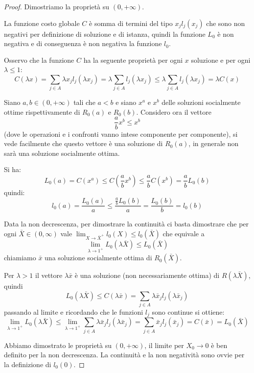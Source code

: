 \documentclass[a4paper]{article}
\theoremstyle{plain}
\theoremstyle{definition}
\theoremstyle{remark}
\newcommand{\pa}[1]{\left(#1\right)}
\begin{document}
\begin{proof}
  Dimostriamo la proprietà su $\pa{0,+\infty}$.

  La funzione costo globale $C$ è somma di termini del tipo $x_j
  l_j(x_j)$ che sono non negativi per definizione di soluzione e di
  istanza, quindi la funzione $L_0$ è non negativa e di conseguenza è
  non negativa la funzione $l_0$.

  Osservo che la funzione $C$ ha la seguente proprietà per ogni $x$
  soluzione e per ogni $\lambda \le 1$:
  \[ C\pa{\lambda x} = \sum _{j\in A} \lambda x_j l_j\pa{\lambda x_j}
    = \lambda \sum _{j\in A} l_j\pa{\lambda x_j} \le \lambda \sum
    _{j\in A} l_j\pa{\lambda x_j} = \lambda C\pa{x} \]

  Siano $a,b\in \pa{0,+\infty}$ tali che $a<b$ e siano $x^a$ e $x^b$
  delle soluzioni socialmente ottime rispettivamente di $R_0\pa{a}$ e
  $R_0\pa{b}$. Considero ora il vettore
  \[ \frac{a}{b} x^b \le x^b \]
  (dove le operazioni e i confronti vanno intese componente per
  componente), si vede facilmente che questo vettore è una soluzione
  di $R_0(a)$, in generale non sarà una soluzione socialmente ottima.

  Si ha:
  \[ L_0\pa{a} = C\pa{x^a} \le C\pa{\frac{a}{b} x^b} \le \frac{a}{b}
    C\pa{x^b} = \frac{a}{b}L_0\pa{b} \]
  quindi:
  \[ l_0(a) = \frac{L_0(a)}{a} \le \frac{\frac{a}{b} L_0(b)}{a}
    =\frac{L_0(b)}{b} = l_0(b) \]
  
  Data la non decrescenza, per dimostrare la continuità ci basta
  dimostrare che per ogni $\bar X\in \pa{0,\infty}$ vale
  $\lim _{X\to \bar X^+} l_0\pa{X} \le l_0\pa{\bar X}$ che equivale a
  \[ \lim _{\lambda \to 1^+} L_0\pa{\lambda \bar X} \le
    L_0\pa{\bar X} \] chiamiamo $\bar x$ una soluzione socialmente
  ottima di $R_0\pa{\bar X}$.
  
  Per $\lambda > 1$ il vettore $\lambda \bar x$ è una soluzione (non
  necessariamente ottima) di $R\pa{\lambda \bar X}$, quindi
  \[ L_0\pa{\lambda \bar X} \le C\pa{\lambda \bar x} = \sum _{j\in A}
    \lambda \bar x_j l_j(\lambda \bar x_j) \]
  passando al limite e ricordando che le funzioni $l_j$ sono continue
  si ottiene:
  \[ \lim _{\lambda \to 1^+} L_0\pa{\lambda \bar X} \le \lim _{\lambda
      \to 1^+} \sum _{j\in A}\lambda \bar x_j l_j\pa{\lambda \bar x_j}
    = \sum _{j\in A} \bar x_j l_j\pa{\bar x_j} = C\pa{\bar x} =
    L_0\pa{\bar X} \]

  Abbiamo dimostrato le proprietà su $\pa{0,+\infty}$, il limite per
  $X_0 \to 0$ è ben definito per la non decrescenza. La continuità e
  la non negatività sono ovvie per la definizione di $l_0\pa{0}$.
\end{proof}
\end{document}
